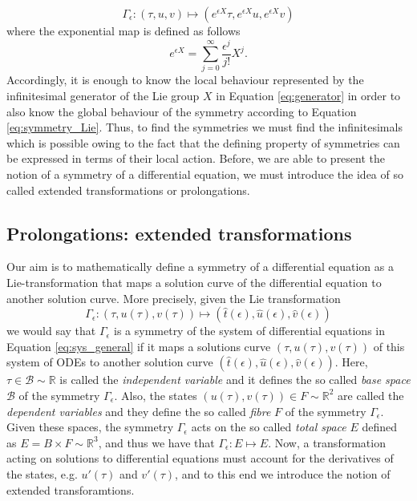 \begin{equation}
\Gamma_{\epsilon}:(\tau,u,v)\mapsto \left(e^{\epsilon X}\tau,e^{\epsilon X}u,e^{\epsilon X}v\right)
  \label{eq:symmetry_Lie}
\end{equation}
where the exponential map is defined as follows
\begin{equation}
  e^{\epsilon X}=\sum_{j=0}^{\infty}\dfrac{\epsilon^j}{j!}X^{j}.
  \label{eq:exponential}
\end{equation}
Accordingly, it is enough to know the local behaviour represented by the infinitesimal generator of the Lie group $X$ in Equation \eqref{eq:generator} in order to also know the global behaviour of the symmetry according to Equation \eqref{eq:symmetry_Lie}. Thus, to find the symmetries we must find the infinitesimals which is possible owing to the fact that the defining property of symmetries can be expressed in terms of their local action. Before, we are able to present the notion of a symmetry of a differential equation, we must introduce the idea of so called extended transformations or prolongations.






\subsection{Prolongations: extended transformations}
Our aim is to mathematically define a symmetry of a differential equation as a Lie-transformation that maps a solution curve of the differential equation to another solution curve. More precisely, given the Lie transformation
$$\Gamma_{\epsilon}:(\tau,u(\tau),v(\tau))\mapsto(\hat{t}(\epsilon),\hat{u}(\epsilon),\hat{v}(\epsilon))$$
we would say that $\Gamma_\epsilon$ is a symmetry of the system of differential equations in Equation \eqref{eq:sys_general} if it maps a solutions curve $(\tau,u(\tau),v(\tau))$ of this system of ODEs to another solution curve $(\hat{t}(\epsilon),\hat{u}(\epsilon),\hat{v}(\epsilon))$. Here, $\tau\in\mathcal{B}\sim\mathbb{R}$ is called the \textit{independent variable} and it defines the so called \textit{base space} $\mathcal{B}$ of the symmetry $\Gamma_\epsilon$. Also, the states $(u(\tau),v(\tau))\in F\sim\mathbb{R}^2$ are called the \textit{dependent variables} and they define the so called \textit{fibre} $F$ of the symmetry $\Gamma_\epsilon$. Given these spaces, the symmetry $\Gamma_\epsilon$ acts on the so called \textit{total space} $E$ defined as $E=B\times F\sim\mathbb{R}^3$, and thus we have that $\Gamma_\epsilon:E\mapsto E$. Now, a transformation acting on solutions to differential equations must account for the derivatives of the states, e.g. $u'(\tau)$ and $v'(\tau)$, and to this end we introduce the notion of extended transforamtions.

